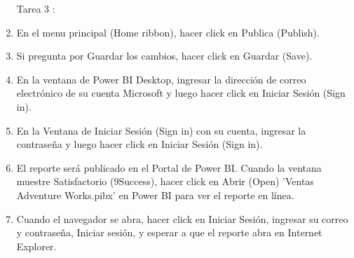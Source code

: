 \begin{enumerate}[1.]
    \item[Tarea 3 :]

    \item   En el menu principal (Home ribbon), hacer click en Publica (Publish). 
    
    \item   Si pregunta por Guardar los cambios, hacer click en Guardar (Save). 

    \item   En la ventana de Power BI Desktop, ingresar la dirección de correo electrónico de su cuenta Microsoft y luego hacer click en Iniciar Sesión (Sign in).
    
    \item  En la Ventana de Iniciar Sesión (Sign in) con su cuenta, ingresar la contraseña y luego hacer click en Iniciar Sesión (Sign in). 
    
    \item  El reporte será publicado en el Portal de Power BI. Cuando la ventana muestre Satisfactorio (9Success), hacer click en Abrir (Open) 'Ventas Adventure Works.pibx' en Power BI para ver el reporte en línea. 
    
    \item  Cuando el navegador se abra, hacer click en Iniciar Sesión, ingresar su correo y contraseña, Iniciar sesión, y esperar a que el reporte abra en Internet Explorer. 
    
     
    
    
\end{enumerate}